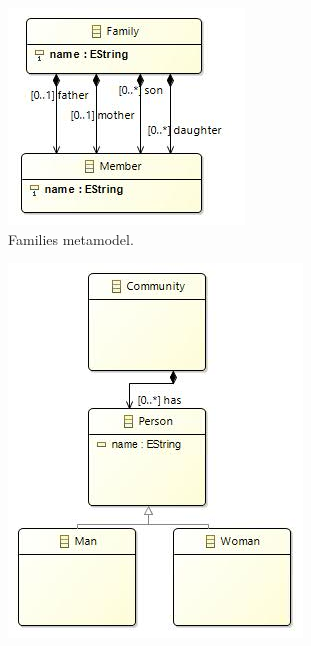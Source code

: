 \begin{figure}
        \centering
        \begin{subfigure}{0.5\linewidth}
                \centering
                \includegraphics[width=\linewidth]{figures/Familiesclassdiagram}
                \caption{Families metamodel.}
                \label{fig:families_mm}
        \end{subfigure}%
        \begin{subfigure}{0.5\linewidth}
                \centering
                \includegraphics[width=\linewidth]{figures/communitydiagram}

\end{subfigure}
\end{figure}
